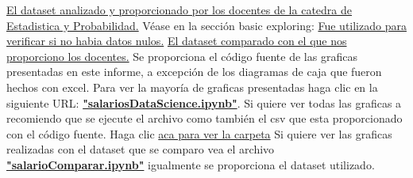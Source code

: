 \documentclass{article}
\begin{document}
	\begin{thebibliography}{0}
		
		 \href{https://www.kaggle.com/datasets/arnabchaki/data-science-salaries-2023}{El dataset analizado y proporcionado por los docentes de la catedra de Estadistica y Probabilidad.}
		Véase en la sección basic exploring: \href{https://www.kaggle.com/code/mudassarshaheen/data-science-salaries-eda-visualization#Employment-Types-}{Fue utilizado para verificar si no habia datos nulos.}
		 \href{https://www.kaggle.com/datasets/cedricaubin/ai-ml-salaries}{El dataset comparado con el que nos proporciono los docentes.}
		Se proporciona el código fuente de las graficas presentadas en este informe, a excepción de los diagramas de caja que fueron hechos con excel. Para ver la mayoría de graficas presentadas haga clic en la siguiente URL: \textbf{\href{https://github.com/LeandroRodrigoMolina/informeEstadisticaTP3/blob/master/codigoFuenteGraficasPython/salariosDataScience.ipynb}{"salariosDataScience.ipynb"}}. Si quiere ver todas las graficas a recomiendo que se ejecute el archivo como también el csv que esta proporcionado con el código fuente. Haga clic \href{https://github.com/LeandroRodrigoMolina/informeEstadisticaTP3/tree/master/codigoFuenteGraficasPython}{aca para ver la carpeta}
		Si quiere ver las graficas realizadas con el dataset que se comparo vea el archivo \textbf{\href{https://github.com/LeandroRodrigoMolina/informeEstadisticaTP3/blob/master/codigoFuenteGraficasPython/salarioComparar.ipynb}{"salarioComparar.ipynb"}} igualmente se proporciona el dataset utilizado.
	\end{thebibliography}
\end{document}
